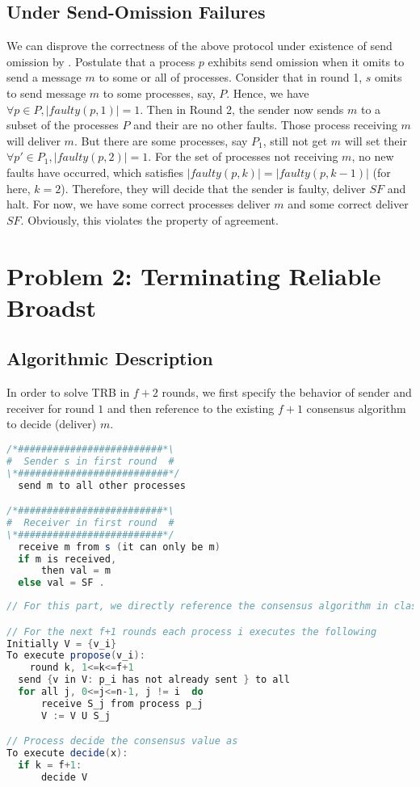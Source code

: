 \documentclass[11pt,a4paper]{article}
\begin{document}
\subsection{Under Send-Omission Failures}
We can disprove the correctness of the above protocol under existence of send
omission by . Postulate that a process $p$ exhibits send omission when it omits
to send a message $m$ to some or all of processes.  
Consider that in round 1, $s$ omits to send message $m$ to some processes,
say, $P$. Hence, we have $\forall p \in P, |faulty(p, 1)| = 1$. Then in Round 2, the sender now sends $m$ to a subset 
of the processes $P$ and their are no other faults. Those process receiving
$m$ will deliver $m$. But there are some processes, say $P_1$, still not get $m$
will set their $\forall p' \in P_1, |faulty(p, 2)| = 1$. For the set of processes not receiving $m$, no new faults have 
occurred, which satisfies $|faulty(p,k)| = |faulty(p,k-1)|$ (for here, $k=2$). Therefore, they
will decide that the sender is faulty, deliver $SF$ and halt.
    For now, we have some correct processes deliver $m$ and some
    correct deliver $SF$. 
    Obviously, this violates the property of agreement.
\newpage

\section{Problem 2: Terminating Reliable Broadst}
\subsection{Algorithmic Description}
    In order to solve TRB in $f+2$ rounds, we first specify the behavior of
    sender and receiver for round $1$ and then reference to the existing $f+1$
    consensus algorithm to decide (deliver) $m$. 

\begin{lstlisting}[language=java]
/*#########################*\
#  Sender s in first round  #
\*##########################*/
  send m to all other processes

/*#########################*\
#  Receiver in first round  #
\*#########################*/
  receive m from s (it can only be m)
  if m is received,
      then val = m 
  else val = SF .
\end{lstlisting}

\begin{lstlisting}[language=java]
// For this part, we directly reference the consensus algorithm in class note

// For the next f+1 rounds each process i executes the following 
Initially V = {v_i}
To execute propose(v_i):
    round k, 1<=k<=f+1
  send {v in V: p_i has not already sent } to all
  for all j, 0<=j<=n-1, j != i  do
      receive S_j from process p_j
      V := V U S_j

// Process decide the consensus value as
To execute decide(x):
  if k = f+1: 
      decide V
\end{lstlisting}
\end{document}
